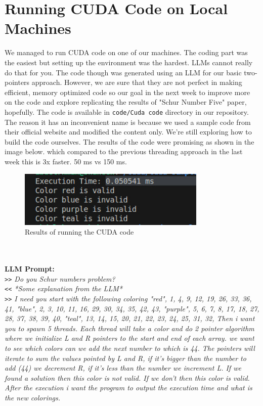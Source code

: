 \documentclass[12pt]{article}
\begin{document}
\section{Running CUDA Code on Local Machines}
We managed to run CUDA code on one of our machines. The coding part 
was the easiest but setting up the environment was the hardest. LLMs cannot really do that
for you. The code though was generated using an LLM for our basic two-pointers approach. However,
we are sure that they are not perfect in making efficient, memory optimized code so our goal in the
next week to improve more on the code and explore replicating the results of "Schur Number Five" paper, hopefully.
The code is available in \texttt{code/Cuda code} directory in our repository. The reason it has an inconvenient name is because we 
used a sample code from their official website and modified the content only. We're still exploring how to 
build the code ourselves. The results of the code were promising as shown in the image below. which compared to the previous threading approach 
in the last week this is 3x faster. 50 ms vs 150 ms.
\begin{figure}[h]
    \centering
    \includegraphics[width=0.8\textwidth]{results.jpg}
    \caption{Results of running the CUDA code}
    \label{fig:results}
\end{figure}
\\ \\
\textbf{LLM Prompt:}
\textit{
\\
\texttt{>>} Do you Schur numbers problem? \\
\texttt{<<} *Some explanation from the LLM* \\
\texttt{>>} I need you start with the following coloring
{"red", {1, 4, 9, 12, 19, 26, 33, 36, 41}},
{"blue", {2, 3, 10, 11, 16, 29, 30, 34, 35, 42, 43}},
{"purple", {5, 6, 7, 8, 17, 18, 27, 28, 37, 38, 39, 40}},
{"teal", {13, 14, 15, 20, 21, 22, 23, 24, 25, 31, 32}},
Then i want you to spawn 5 threads. Each thread will take a color and do 2 pointer algorithm where we initialize L and R pointers to the start and end of each array. we want to see which colors can we add the next number to which is 44. The pointers will iterate to sum the values pointed by L and R, if it's bigger than the number to add (44) we decrement R, if it's less than the number we increment L. If we found a solution then this color is not valid. If we don't then this color is valid. After the execution i want the program to output the execution time and what is the new colorings.}
\end{document}
